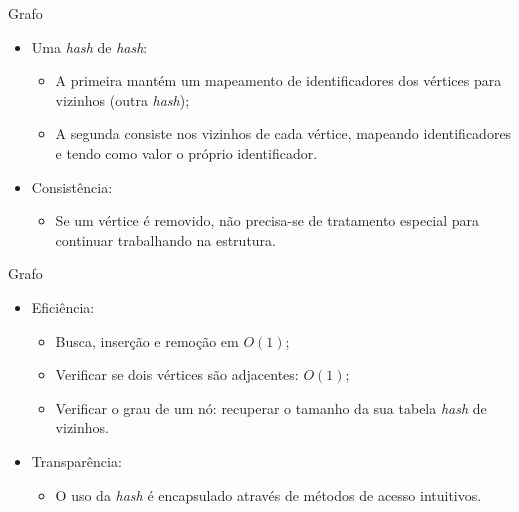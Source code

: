 \documentclass[compress, hide notes]{beamer}
\let\olditem=\item%
\renewcommand{\item}{\olditem \justifying}%
\begin{document}
 
 
 \begin{frame}{Grafo}
 	
   \begin{itemize}
     \item Uma \textit{hash} de \textit{hash}:
     \bigskip
     \begin{itemize}
     
       \item A primeira mantém um mapeamento de identificadores dos vértices para vizinhos (outra \textit{hash});
     \bigskip
       \item A segunda consiste nos vizinhos de cada vértice, mapeando identificadores e tendo como valor o próprio identificador.
     \end{itemize}
     
     \bigskip     
     
     \item Consistência:
     \begin{itemize}
    	 \item Se um vértice é removido, não precisa-se de tratamento especial para continuar trabalhando na estrutura.
     \end{itemize}
   \end{itemize}
     
 \end{frame}
 
 
 
 \begin{frame}{Grafo}
     
   \begin{itemize}
     \item Eficiência:
     \bigskip
     \begin{itemize}
       \item Busca, inserção e remoção em $O(1)$;
     \bigskip
       \item Verificar se dois vértices são adjacentes: $O(1)$;
     \bigskip
       \item Verificar o grau de um nó: recuperar o tamanho da sua tabela \textit{hash} de vizinhos.
     \end{itemize}
     
     \bigskip
     
     \item Transparência:
     \bigskip
     \begin{itemize}
     	\item O uso da \textit{hash} é encapsulado através de métodos de acesso intuitivos.
     \end{itemize}
   \end{itemize}

 \end{frame}
 
\end{document}
